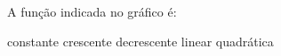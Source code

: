 A função indicada no gráfico é:

\parbox{0.45\linewidth}{

constante
crescente
decrescente
linear
quadrática

}\parbox{0.55\linewidth}{
}


